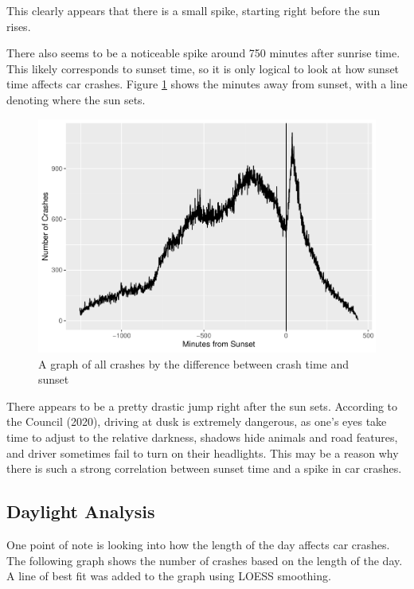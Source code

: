 \documentclass[conference,final,]{IEEEtran}
\begin{document}
This clearly appears that there is a small spike, starting right before the sun rises.

There also seems to be a noticeable spike around 750 minutes after sunrise time. This likely corresponds to sunset time, so it is only logical to look at how sunset time affects car crashes. Figure \ref{fig:sunset} shows the minutes away from sunset, with a line denoting where the sun sets.

\begin{figure}

{\centering \includegraphics[width=0.9\columnwidth]{CAUSE_files/figure-latex/sunset-1} 

}

\caption{A graph of all crashes by the difference between crash time and sunset}\label{fig:sunset}
\end{figure}

There appears to be a pretty drastic jump right after the sun sets. According to the Council (2020), driving at dusk is extremely dangerous, as one's eyes take time to adjust to the relative darkness, shadows hide animals and road features, and driver sometimes fail to turn on their headlights. This may be a reason why there is such a strong correlation between sunset time and a spike in car crashes.

\hypertarget{daylight-analysis}{%
\subsection{Daylight Analysis}\label{daylight-analysis}}

One point of note is looking into how the length of the day affects car crashes. The following graph shows the number of crashes based on the length of the day. A line of best fit was added to the graph using LOESS smoothing.
\end{document}
